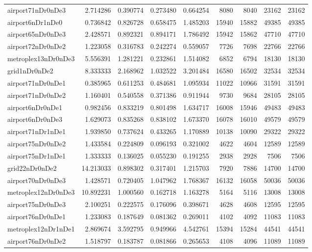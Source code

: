 \begin{longtable}{|l|r|r|r|r|r|r|r|r|}
airport71nDr0nDe3 & 2.714286 & 0.390774 & 0.273480 & 0.664254 & 8080 & 8040 & 23162 & 23162 \\
airport6nDr1nDe0 & 0.736842 & 0.826728 & 0.658475 & 1.485203 & 15940 & 15882 & 49385 & 49385 \\
airport65nDr0nDe3 & 2.428571 & 0.892321 & 0.894171 & 1.786492 & 15942 & 15862 & 47710 & 47710 \\
airport72nDr0nDe2 & 1.223058 & 0.316783 & 0.242274 & 0.559057 & 7726 & 7698 & 22766 & 22766 \\
metroplex13nDr0nDe3 & 5.556391 & 1.281221 & 0.232861 & 1.514082 & 6852 & 6794 & 18130 & 18130 \\
grid1nDr0nDe2 & 8.333333 & 2.168962 & 1.032522 & 3.201484 & 16580 & 16502 & 32534 & 32534 \\
airport71nDr0nDe1 & 0.385965 & 0.611253 & 0.484681 & 1.095934 & 11022 & 10966 & 31591 & 31591 \\
airport71nDr0nDe2 & 1.160401 & 0.540558 & 0.371386 & 0.911944 & 9730 & 9684 & 28105 & 28105 \\
airport6nDr0nDe1 & 0.982456 & 0.833219 & 0.801498 & 1.634717 & 16008 & 15946 & 49483 & 49483 \\
airport6nDr0nDe3 & 1.629073 & 0.835268 & 0.838102 & 1.673370 & 16078 & 16010 & 49579 & 49579 \\
airport71nDr1nDe1 & 1.939850 & 0.737624 & 0.433265 & 1.170889 & 10138 & 10090 & 29322 & 29322 \\
airport75nDr0nDe2 & 1.433584 & 0.224809 & 0.096193 & 0.321002 & 4622 & 4604 & 12589 & 12589 \\
airport75nDr1nDe1 & 1.333333 & 0.136025 & 0.055230 & 0.191255 & 2938 & 2928 & 7506 & 7506 \\
grid22nDr0nDe2 & 14.213033 & 0.898302 & 0.317401 & 1.215703 & 7920 & 7886 & 14700 & 14700 \\
airport70nDr0nDe3 & 1.428571 & 0.720405 & 1.047962 & 1.768367 & 16132 & 16058 & 50036 & 50036 \\
metroplex12nDr0nDe3 & 10.892231 & 1.000560 & 0.162718 & 1.163278 & 5164 & 5116 & 13008 & 13008 \\
airport75nDr0nDe3 & 2.100251 & 0.222575 & 0.176096 & 0.398671 & 4628 & 4608 & 12595 & 12595 \\
airport76nDr0nDe1 & 1.233083 & 0.187649 & 0.081362 & 0.269011 & 4102 & 4092 & 11083 & 11083 \\
metroplex12nDr1nDe1 & 2.869674 & 3.592795 & 0.949966 & 4.542761 & 15394 & 15284 & 44541 & 44541 \\
airport76nDr0nDe2 & 1.518797 & 0.183787 & 0.081866 & 0.265653 & 4108 & 4096 & 11089 & 11089 \\

\end{longtable}
